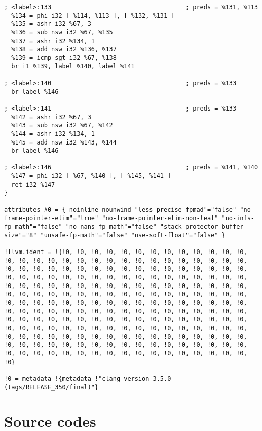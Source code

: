 \begin{lstlisting}
; <label>:133                                     ; preds = %131, %113
  %134 = phi i32 [ %114, %113 ], [ %132, %131 ]
  %135 = ashr i32 %67, 3
  %136 = sub nsw i32 %67, %135
  %137 = ashr i32 %134, 1
  %138 = add nsw i32 %136, %137
  %139 = icmp sgt i32 %67, %138
  br i1 %139, label %140, label %141

; <label>:140                                     ; preds = %133
  br label %146

; <label>:141                                     ; preds = %133
  %142 = ashr i32 %67, 3
  %143 = sub nsw i32 %67, %142
  %144 = ashr i32 %134, 1
  %145 = add nsw i32 %143, %144
  br label %146

; <label>:146                                     ; preds = %141, %140
  %147 = phi i32 [ %67, %140 ], [ %145, %141 ]
  ret i32 %147
}

attributes #0 = { noinline nounwind "less-precise-fpmad"="false" "no-frame-pointer-elim"="true" "no-frame-pointer-elim-non-leaf" "no-infs-fp-math"="false" "no-nans-fp-math"="false" "stack-protector-buffer-size"="8" "unsafe-fp-math"="false" "use-soft-float"="false" }

!llvm.ident = !{!0, !0, !0, !0, !0, !0, !0, !0, !0, !0, !0, !0, !0, !0, !0, !0, !0, !0, !0, !0, !0, !0, !0, !0, !0, !0, !0, !0, !0, !0, !0, !0, !0, !0, !0, !0, !0, !0, !0, !0, !0, !0, !0, !0, !0, !0, !0, !0, !0, !0, !0, !0, !0, !0, !0, !0, !0, !0, !0, !0, !0, !0, !0, !0, !0, !0, !0, !0, !0, !0, !0, !0, !0, !0, !0, !0, !0, !0, !0, !0, !0, !0, !0, !0, !0, !0, !0, !0, !0, !0, !0, !0, !0, !0, !0, !0, !0, !0, !0, !0, !0, !0, !0, !0, !0, !0, !0, !0, !0, !0, !0, !0, !0, !0, !0, !0, !0, !0, !0, !0, !0, !0, !0, !0, !0, !0, !0, !0, !0, !0, !0, !0, !0, !0, !0, !0, !0, !0, !0, !0, !0, !0, !0, !0, !0, !0, !0, !0, !0, !0, !0, !0, !0, !0, !0, !0, !0, !0, !0, !0, !0, !0, !0, !0, !0, !0, !0, !0, !0, !0, !0, !0, !0, !0, !0, !0, !0, !0, !0, !0, !0, !0, !0, !0, !0, !0, !0, !0, !0, !0, !0, !0, !0, !0, !0, !0, !0, !0, !0, !0, !0, !0, !0, !0, !0, !0, !0, !0, !0, !0, !0, !0, !0, !0, !0, !0, !0, !0}

!0 = metadata !{metadata !"clang version 3.5.0 (tags/RELEASE_350/final)"}

\end{lstlisting}

\section{\label{sec:sourcecode}Source codes}
\lstset{language=C,style=Cstyle%
}

